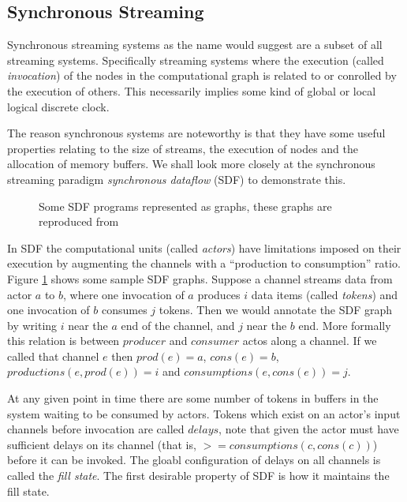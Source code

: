 \subsection{Synchronous Streaming}
\label{BACK_SYNC}

Synchronous streaming systems as the name would suggest are a subset of all streaming systems.
Specifically streaming systems where the execution (called {\em invocation}) of the nodes in the computational graph is related to or conrolled by the execution of others.
This necessarily implies some kind of global or local logical discrete clock.

The reason synchronous systems are noteworthy is that they have some useful properties relating to the size of streams, the execution of nodes and the allocation of memory buffers.
We shall look more closely at the synchronous streaming paradigm {\em synchronous dataflow} (SDF) to demonstrate this.

\begin{figure}
\begin{center}
	
\caption{Some SDF programs represented as graphs, these graphs are reproduced from \cite{sdfBook}}
\label{figSimpleSDF}
\end{center}
\end{figure}

In SDF the computational units (called {\em actors}) have limitations imposed on their execution by augmenting the channels with a ``production to consumption'' ratio.
Figure \ref{figSimpleSDF} shows some sample SDF graphs.
Suppose a channel streams data from actor $a$ to $b$, where one invocation of $a$ produces $i$ data items (called {\em tokens}) and one invocation of $b$ consumes $j$ tokens.
Then we would annotate the SDF graph by writing $i$ near the $a$ end of the channel, and $j$ near the $b$ end.
More formally this relation is between $producer$ and $consumer$ actos along a channel.
If we called that channel $e$ then $prod(e) = a$, $cons(e) = b$, $productions(e, prod(e)) = i$ and $consumptions(e, cons(e)) = j$.

At any given point in time there are some number of tokens in buffers in the system waiting to be consumed by actors.
Tokens which exist on an actor's input channels before invocation are called $delays$, note that given the actor must have sufficient delays on its channel (that is, $>= consumptions(c, cons(c))$) before it can be invoked.
The gloabl configuration of delays on all channels is called the {\em fill state}.
The first desirable property of SDF is how it maintains the fill state.


